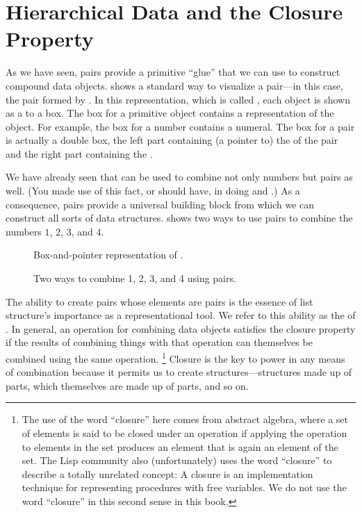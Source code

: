 \section{Hierarchical Data and the Closure Property}
\label{Section 2.2}

As we have seen, pairs provide a primitive “glue” that we can use to construct compound data objects.
 shows a standard way to visualize a pair---in this case, the pair formed by .
In this representation, which is called , each object is shown as a  to a box.
The box for a primitive object contains a representation of the object.
For example, the box for a number contains a numeral.
The box for a pair is actually a double box, the left part containing (a pointer to) the  of the pair and the right part containing the .

We have already seen that  can be used to combine not only numbers but pairs as well.
(You made use of this fact, or should have, in doing  and .)
As a consequence, pairs provide a universal building block from which we can construct all sorts of data structures.
 shows two ways to use pairs to combine the numbers \( 1 \), \( 2 \), \( 3 \), and \( 4 \).

\begin{figure}[tb]
	\centering
	
	\caption{
		Box-and-pointer representation of .
	}
	\label{Figure 2.2}
\end{figure}

\begin{figure}[tb]
	\centering
	
	\caption{
		Two ways to combine 1, 2, 3, and 4 using pairs.
	}
	\label{Figure 2.3}
\end{figure}

The ability to create pairs whose elements are pairs is the essence of list structure’s importance as a representational tool.
We refer to this ability as the  of .
In general, an operation for combining data objects satisfies the closure property if the results of combining things with that operation can themselves be combined using the same operation.%
\footnote{
	The use of the word “closure” here comes from abstract algebra, where a set of elements is said to be closed under an operation if applying the operation to elements in the set produces an element that is again an element of the set.
	The Lisp community also (unfortunately) uses the word “closure” to describe a totally unrelated concept:
	A closure is an implementation technique for representing procedures with free variables.
	We do not use the word “closure” in this second sense in this book.
}
Closure is the key to power in any means of combination because it permits us to create  structures---structures made up of parts, which themselves are made up of parts, and so on.

